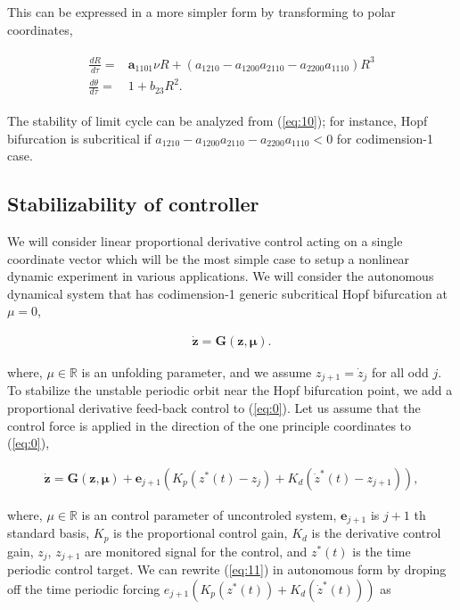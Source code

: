 \documentclass[openacc]{rsproca_new}%
\def\real{\mathbb{R}}
\def\vec#1{\ensuremath{\mathbf{#1}}}
\newcommand{\Eref}[1]{(\ref{#1})}
\begin{document}
\noindent This can be expressed in a more simpler form by transforming to polar coordinates,

\begin{align}\label{eq:10}
\begin{split}
\frac{dR}{d\tau}=&\vec{a}_{1101}\nu R+(a_{1210}-a_{1200}a_{2110}-a_{2200}a_{1110})R^3\\
\frac{d\theta}{d\tau}=&1+b_{23}R^2.
\end{split}
\end{align}

\noindent The stability of limit cycle can be analyzed from \Eref{eq:10}; for instance, Hopf bifurcation is subcritical if \(a_{1210}-a_{1200}a_{2110}-a_{2200}a_{1110}<0\) for codimension-1 case.


\subsection{Stabilizability of controller}

We will consider linear proportional derivative control acting on a single coordinate vector which will be the most simple case to setup a nonlinear dynamic experiment in various applications. We will consider the autonomous dynamical system that has codimension-1 generic subcritical Hopf bifurcation at $\mu=0$,

\begin{align}\label{eq:0}
    \dot{\vec{z}} =\vec{G}(\vec{z},\vec{\mu}).
\end{align}

\noindent where, $\mu\in \real$ is an unfolding parameter, and we assume $z_{j+1}=\dot z_j$ for all odd $j$. To stabilize the unstable periodic orbit near the Hopf bifurcation point, we add a proportional derivative feed-back control to \Eref{eq:0}. Let us assume that the control force is applied in the direction of the one principle coordinates to \Eref{eq:0},

\begin{align}\label{eq:11}
    \dot{\vec{z}} =\vec{G}(\vec{z},\vec{\mu})+\vec{e}_{j+1}(K_p(z^*(t)-z_j)+K_d(\dot z^*(t)-z_{j+1})),
\end{align}

\noindent where, $\mu\in \real$ is an control parameter of uncontroled system, $\vec{e}_{j+1}$ is $j+1$ th standard basis, $K_p$ is the proportional control gain, $K_d$ is the derivative control gain, $z_{j}$, $z_{j+1}$ are monitored signal for the control, and $z^*(t)$  is the time periodic control target. We can rewrite \Eref{eq:11} in autonomous form by droping off the time periodic forcing $e_{j+1}(K_p(z^*(t))+K_d(\dot z^*(t)))$ as
\end{document}
